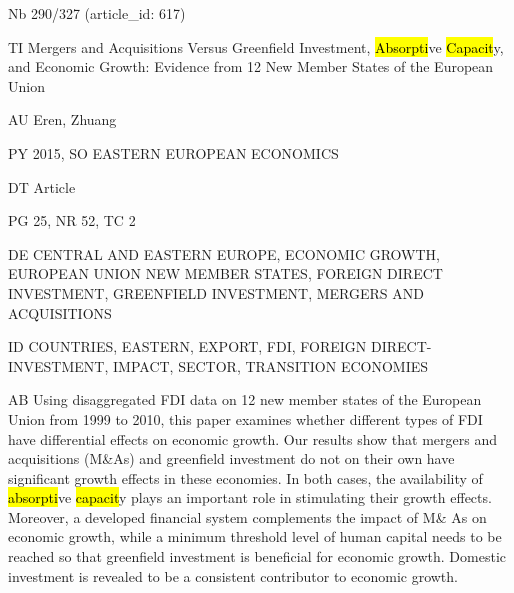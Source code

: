 \documentclass[a4paper]{article}
\begin{document}
\vspace*{-2cm}
Nb \tabto{0cm}290/327 (article\_id: 617)\par
TI \tabto{0cm}Mergers and Acquisitions Versus Greenfield Investment, \hl{Absorpti}ve \hl{Capacit}y, and Economic Growth: Evidence from 12 New Member States of the European Union\par
AU \tabto{0cm}Eren, Zhuang\par
PY \tabto{0cm}2015, SO EASTERN EUROPEAN ECONOMICS\par
DT \tabto{0cm}Article\par
PG \tabto{0cm}25, NR 52, TC 2\par
DE \tabto{0cm}CENTRAL AND EASTERN EUROPE, ECONOMIC GROWTH, EUROPEAN UNION NEW MEMBER STATES, FOREIGN DIRECT INVESTMENT, GREENFIELD INVESTMENT, MERGERS AND ACQUISITIONS\par
ID \tabto{0cm}COUNTRIES, EASTERN, EXPORT, FDI, FOREIGN DIRECT-INVESTMENT, IMPACT, SECTOR, TRANSITION ECONOMIES\par
AB \tabto{0cm}Using disaggregated FDI data on 12 new member states of the European Union from 1999 to 2010, this paper examines whether different types of FDI have differential effects on economic growth. Our results show that mergers and acquisitions (M\&As) and greenfield investment do not on their own have significant growth effects in these economies. In both cases, the availability of \hl{absorpti}ve \hl{capacit}y plays an important role in stimulating their growth effects. Moreover, a developed financial system complements the impact of M\& As on economic growth, while a minimum threshold level of human capital needs to be reached so that greenfield investment is beneficial for economic growth. Domestic investment is revealed to be a consistent contributor to economic growth.\par
\clearpage
\end{document}
